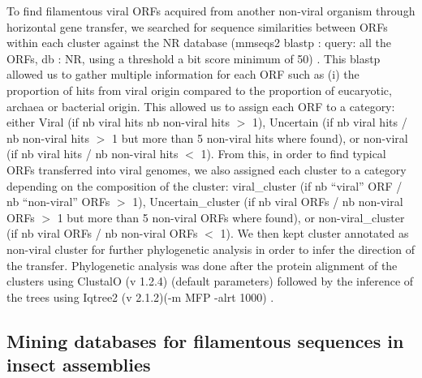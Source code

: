 To find filamentous viral ORFs acquired from another non-viral organism through horizontal gene transfer, we searched for sequence similarities between ORFs within each cluster against the NR database (mmseqs2 blastp : query: all the ORFs, db : NR, using a threshold a bit score minimum of 50) \citep{steinegger_mmseqs2_2017}. This blastp allowed us to gather multiple information for each ORF such as (i) the proportion of hits from viral origin compared to the proportion of eucaryotic, archaea or bacterial origin. This allowed us to assign each ORF to a category: either Viral (if nb viral hits  nb non-viral hits $>$ 1), Uncertain (if nb viral hits / nb non-viral hits $>$ 1 but more than 5 non-viral hits where found), or non-viral (if nb viral hits / nb non-viral hits $<$ 1). From this, in order to find typical ORFs transferred into viral genomes, we also assigned each cluster to a category depending on the composition of the cluster: viral\_cluster (if nb “viral” ORF / nb “non-viral” ORFs $>$ 1), Uncertain\_cluster (if nb viral ORFs / nb non-viral ORFs $>$ 1 but more than 5 non-viral ORFs where found), or non-viral\_cluster (if nb viral ORFs / nb non-viral ORFs $<$ 1). We then kept cluster annotated as non-viral cluster for further phylogenetic analysis in order to infer the direction of the transfer. Phylogenetic analysis was done after the protein alignment of the clusters using ClustalO (v 1.2.4) (default parameters) \citep{sievers_clustal_2018} followed by the inference of the trees using Iqtree2 (v 2.1.2)(-m MFP -alrt 1000) \citep{minh_iq-tree_2020}.  

\subsection{Mining databases for filamentous sequences in insect assemblies}

